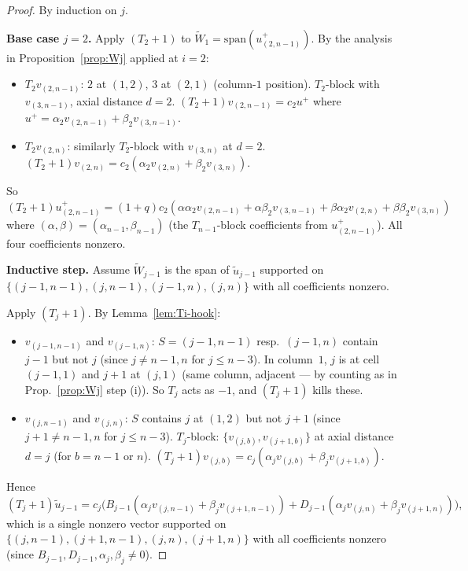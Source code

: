 \documentclass[11pt]{article}
\theoremstyle{definition}
\begin{document}
\begin{proof}
By induction on $j$.

\textbf{Base case $j=2$.}  Apply $(T_2{+}1)$ to $\widetilde W_1=
\mathrm{span}(u^+_{(2,n-1)})$.  By the analysis in
Proposition~\ref{prop:Wj} applied at $i=2$:
\begin{itemize}[leftmargin=2em,topsep=0.3em,itemsep=0.2em]
\item $T_2v_{(2,n-1)}$: $2$ at $(1,2)$, $3$ at $(2,1)$ (column-$1$
position).  $T_2$-block with $v_{(3,n-1)}$, axial distance $d=2$.
$(T_2{+}1)v_{(2,n-1)}=c_2 u^+$ where $u^+=\alpha_2 v_{(2,n-1)}+\beta_2 v_{(3,n-1)}$.

\item $T_2v_{(2,n)}$: similarly $T_2$-block with $v_{(3,n)}$ at $d=2$.
$(T_2{+}1)v_{(2,n)}=c_2(\alpha_2 v_{(2,n)}+\beta_2 v_{(3,n)})$.
\end{itemize}
So $(T_2{+}1)u^+_{(2,n-1)} = (1{+}q)c_2(\alpha\alpha_2 v_{(2,n-1)} +
\alpha\beta_2 v_{(3,n-1)} + \beta\alpha_2 v_{(2,n)} + \beta\beta_2 v_{(3,n)})$
where $(\alpha,\beta)=(\alpha_{n-1},\beta_{n-1})$ (the $T_{n-1}$-block
coefficients from $u^+_{(2,n-1)}$).  All four coefficients nonzero.

\textbf{Inductive step.}  Assume $\widetilde W_{j-1}$ is the span of
$\widetilde u_{j-1}$ supported on
$\{(j-1,n-1),(j,n-1),(j-1,n),(j,n)\}$ with all coefficients nonzero.

Apply $(T_j{+}1)$.  By Lemma~\ref{lem:Ti-hook}:
\begin{itemize}[leftmargin=2em,topsep=0.3em,itemsep=0.2em]
\item $v_{(j-1,n-1)}$ and $v_{(j-1,n)}$: $S=(j-1,n-1)$ resp.\ $(j-1,n)$
contain $j-1$ but not $j$ (since $j\ne n-1,n$ for $j\le n-3$).  In
column~$1$, $j$ is at cell $(j-1,1)$ and $j+1$ at $(j,1)$ (same column,
adjacent --- by counting as in Prop.~\ref{prop:Wj} step (i)).  So
$T_j$ acts as $-1$, and $(T_j{+}1)$ kills these.

\item $v_{(j,n-1)}$ and $v_{(j,n)}$: $S$ contains $j$ at $(1,2)$ but
not $j+1$ (since $j+1\ne n-1,n$ for $j\le n-3$).  $T_j$-block:
$\{v_{(j,b)},v_{(j+1,b)}\}$ at axial distance $d=j$ (for $b=n-1$ or $n$).
$(T_j{+}1)v_{(j,b)} = c_j(\alpha_j v_{(j,b)}+\beta_j v_{(j+1,b)})$.
\end{itemize}
Hence
\[
   (T_j{+}1)\widetilde u_{j-1} = c_j\bigl(B_{j-1}(\alpha_j v_{(j,n-1)}+\beta_j v_{(j+1,n-1)}) +
   D_{j-1}(\alpha_j v_{(j,n)}+\beta_j v_{(j+1,n)})\bigr),
\]
which is a single nonzero vector supported on $\{(j,n-1),(j+1,n-1),
(j,n),(j+1,n)\}$ with all coefficients nonzero (since $B_{j-1},D_{j-1},
\alpha_j,\beta_j\ne 0$).
\end{proof}
\end{document}
